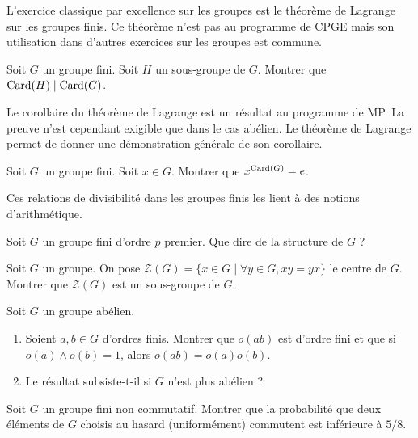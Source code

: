 \documentclass[12pt,a4paper]{exo_book}
\begin{document}
L'exercice classique par excellence sur les groupes est le théorème de Lagrange sur les groupes finis. Ce théorème n'est pas au programme de CPGE mais son utilisation dans d'autres exercices sur les groupes est commune.

\begin{exo}
 Soit $G$ un groupe fini. Soit $H$ un sous-groupe de $G$. Montrer que $\operatorname{Card} (H) \mid \operatorname{Card} (G)$.
\end{exo}

Le corollaire du théorème de Lagrange est un résultat au programme de MP. La preuve n'est cependant exigible que dans le cas abélien. Le théorème de Lagrange permet de donner une démonstration générale de son corollaire.

\begin{exo}
 Soit $G$ un groupe fini. Soit $x \in G$. Montrer que $x ^ {\operatorname{Card} (G)} = e$.
\end{exo}

Ces relations de divisibilité dans les groupes finis les lient à des notions d'arithmétique.

\begin{exo}
    Soit $G$ un groupe fini d'ordre $p$ premier. Que dire de la structure de $G$ ?
\end{exo}

\begin{exo}
    Soit $G$ un groupe. On pose $\mathcal{Z}(G) = \{x \in G \mid \forall y\in G, xy=yx\}$ le centre de $G$. Montrer que $\mathcal{Z}(G)$ est un sous-groupe de $G$.
\end{exo}

\begin{exo}
    Soit $G$ un groupe abélien.
    \begin{enumerate}
        \item Soient $a,b \in G$ d'ordres finis. Montrer que $o(ab)$ est d'ordre fini et que si $o(a) \wedge o(b) = 1$, alors $o(ab)=o(a)o(b)$.
        \item Le résultat subsiste-t-il si $G$ n'est plus abélien ?
    \end{enumerate}
\end{exo}

\begin{exo}
    Soit $G$ un groupe fini non commutatif. Montrer que la probabilité que deux éléments de $G$ choisis au hasard (uniformément) commutent est inférieure à $5/8$.
\end{exo}
\end{document}

